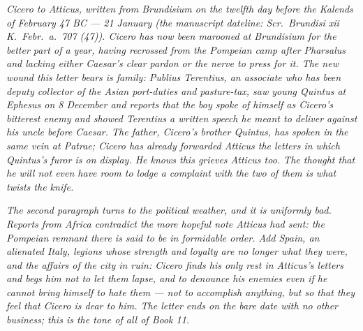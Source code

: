 
\textit{Cicero to Atticus, written from Brundisium on the
twelfth day before the Kalends of February 47 BC --- 21
January (the manuscript dateline: \textit{Scr.\ Brundisi
xii K.\ Febr.\ a.\ 707 (47)}). Cicero has now been
marooned at Brundisium for the better part of a year,
having recrossed from the Pompeian camp after Pharsalus
and lacking either Caesar's clear pardon or the nerve to
press for it. The new wound this letter bears is family:
Publius Terentius, an associate who has been deputy
collector of the Asian port-duties and pasture-tax, saw
young Quintus at Ephesus on 8 December and reports that
the boy spoke of himself as Cicero's bitterest enemy and
showed Terentius a written speech he meant to deliver
against his uncle before Caesar. The father, Cicero's
brother Quintus, has spoken in the same vein at Patrae;
Cicero has already forwarded Atticus the letters in
which Quintus's \textit{furor} is on display. He knows
this grieves Atticus too. The thought that he will not
even have room to lodge a complaint with the two of them
is what twists the knife.}

\textit{The second paragraph turns to the political
weather, and it is uniformly bad. Reports from Africa
contradict the more hopeful note Atticus had sent: the
Pompeian remnant there is said to be in formidable
order. Add Spain, an alienated Italy, legions
whose strength and loyalty are no longer what they
were, and the affairs of the city in ruin: Cicero finds
his only rest in Atticus's letters and begs him not to
let them lapse, and to denounce his enemies even if he
cannot bring himself to hate them --- not to accomplish
anything, but so that they feel that Cicero is dear to
him. The letter ends on the bare date with no other
business; this is the tone of all of Book 11.}
